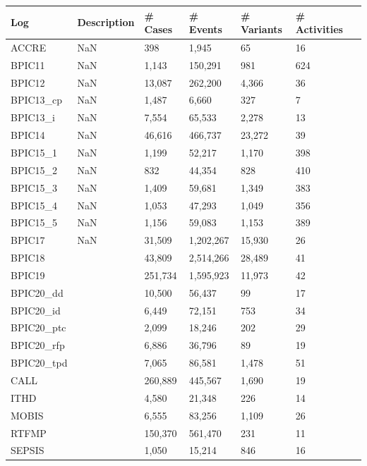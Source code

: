 \begin{tabular}{lllllll}
\toprule
       Log & Description & \# Cases & \# Events & \# Variants & \# Activities \\
\midrule
     ACCRE &         NaN & 398 &     1,945 &          65 &            16 \\
    BPIC11 &         NaN & 1,143 &   150,291 &         981 &           624 \\
    BPIC12 &         NaN & 13,087 &   262,200 &       4,366 &            36 \\
 BPIC13_cp &         NaN & 1,487 &     6,660 &         327 &             7 \\
  BPIC13_i &         NaN & 7,554 &    65,533 &       2,278 &            13 \\
    BPIC14 &         NaN & 46,616 &   466,737 &      23,272 &            39 \\
  BPIC15_1 &         NaN & 1,199 &    52,217 &       1,170 &           398 \\
  BPIC15_2 &         NaN & 832 &    44,354 &         828 &           410 \\
  BPIC15_3 &         NaN & 1,409 &    59,681 &       1,349 &           383 \\
  BPIC15_4 &         NaN & 1,053 &    47,293 &       1,049 &           356 \\
  BPIC15_5 &         NaN & 1,156 &    59,083 &       1,153 &           389 \\
    BPIC17 &         NaN & 31,509 & 1,202,267 &      15,930 &            26 \\
    BPIC18 &             & 43,809 & 2,514,266 &      28,489 &            41 \\
    BPIC19 &             & 251,734 & 1,595,923 &      11,973 &            42 \\
 BPIC20_dd &             & 10,500 &    56,437 &          99 &            17 \\
 BPIC20_id &             & 6,449 &    72,151 &         753 &            34 \\
BPIC20_ptc &             & 2,099 &    18,246 &         202 &            29 \\
BPIC20_rfp &             & 6,886 &    36,796 &          89 &            19 \\
BPIC20_tpd &             & 7,065 &    86,581 &       1,478 &            51 \\
      CALL &             & 260,889 &   445,567 &       1,690 &            19 \\
      ITHD &             & 4,580 &    21,348 &         226 &            14 \\
     MOBIS &             & 6,555 &    83,256 &       1,109 &            26 \\
     RTFMP &             & 150,370 &   561,470 &         231 &            11 \\
    SEPSIS &             & 1,050 &    15,214 &         846 &            16 \\
\bottomrule
\end{tabular}
